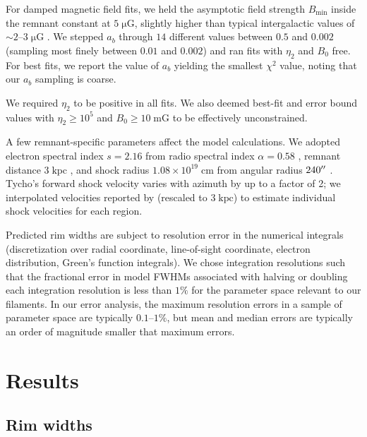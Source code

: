 \documentclass[iop, apj, numberedappendix]{emulateapj}
\newcommand*{\mt}{\mathrm}
\newcommand*{\unit}[1]{\;\mt{#1}}  %
\newcommand*{\abt}{\mathord{\sim}} %
\newcommand*{\Bmin}{B_{\mt{min}}}
\newcommand*{\muG}{\unit{\mu G}}
\begin{document}
For damped magnetic field fits, we held the asymptotic field strength
$\Bmin$ inside the remnant constant at $5 \muG$, slightly higher than
typical intergalactic values of $\abt 2$--$3 \muG$ \citep{lyne1989, han2006}.
We stepped $a_b$ through $14$ different values between $0.5$ and $0.002$ (sampling
most finely between $0.01$ and $0.002$) and ran fits with $\eta_2$ and $B_0$
free.  For best fits, we report the value of $a_b$ yielding the smallest
$\chi^2$ value, noting that our $a_b$ sampling is coarse.

We required $\eta_2$ to be positive in all fits.  We also deemed
best-fit and error bound values with $\eta_2 \geq 10^5$ and $B_0 \geq 10
\unit{mG}$ to be effectively unconstrained. %

A few remnant-specific parameters affect the model calculations.  We adopted
electron spectral index $s = 2.16$ from radio spectral index $\alpha = 0.58$
\citep{sun2011}, remnant distance $3 \unit{kpc}$ \citep[cf.][]{hayato2010}, and
shock radius $1.08 \times 10^{19} \unit{cm}$ from angular radius $240\mbox{$^{\prime\prime}$}$
\citep{green2014}.  Tycho's forward shock velocity varies with azimuth by up to
a factor of 2; we interpolated velocities reported by \citet{williams2013}
(rescaled to $3 \unit{kpc}$) to estimate individual shock velocities for each
region.

Predicted rim widths are subject to resolution error in the numerical integrals
(discretization over radial coordinate, line-of-sight coordinate, electron
distribution, Green's function integrals).  We chose integration resolutions
such that the fractional error in model FWHMs associated with halving or
doubling each integration resolution is less than $1\%$ for the parameter space
relevant to our filaments.  In our error analysis, the maximum resolution
errors in a sample of parameter space are typically $0.1$--$1\%$, but mean and
median errors are typically an order of magnitude smaller that maximum errors.

\section{Results}

\subsection{Rim widths}
\label{sec:fwhm-results}
\end{document}
